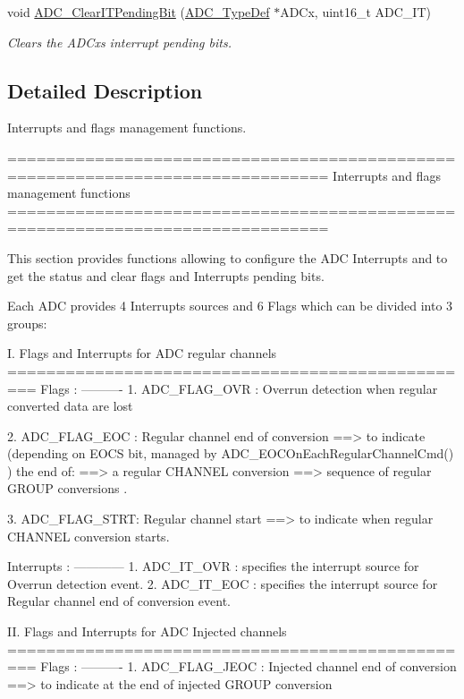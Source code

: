 \begin{DoxyCompactItemize}
void \hyperlink{group___a_d_c___group7_ga601c6a67bd883eb631ecc7aa5e999b9c}{A\+D\+C\+\_\+\+Clear\+I\+T\+Pending\+Bit} (\hyperlink{struct_a_d_c___type_def}{A\+D\+C\+\_\+\+Type\+Def} $\ast$A\+D\+Cx, uint16\+\_\+t A\+D\+C\+\_\+\+IT)
\begin{DoxyCompactList}\small\item\em Clears the A\+D\+Cx\textquotesingle{}s interrupt pending bits. \end{DoxyCompactList}\end{DoxyCompactItemize}


\subsection{Detailed Description}
Interrupts and flags management functions. 

\begin{DoxyVerb} ===============================================================================
                   Interrupts and flags management functions
 ===============================================================================  

  This section provides functions allowing to configure the ADC Interrupts and 
  to get the status and clear flags and Interrupts pending bits.
  
  Each ADC provides 4 Interrupts sources and 6 Flags which can be divided into 
  3 groups:
  
  I. Flags and Interrupts for ADC regular channels
  =================================================
  Flags :
  ---------- 
     1. ADC_FLAG_OVR : Overrun detection when regular converted data are lost

     2. ADC_FLAG_EOC : Regular channel end of conversion ==> to indicate (depending 
              on EOCS bit, managed by ADC_EOCOnEachRegularChannelCmd() ) the end of:
               ==> a regular CHANNEL conversion 
               ==> sequence of regular GROUP conversions .

     3. ADC_FLAG_STRT: Regular channel start ==> to indicate when regular CHANNEL 
              conversion starts.

  Interrupts :
  ------------
     1. ADC_IT_OVR : specifies the interrupt source for Overrun detection event.  
     2. ADC_IT_EOC : specifies the interrupt source for Regular channel end of 
                     conversion event.
  
  
  II. Flags and Interrupts for ADC Injected channels
  =================================================
  Flags :
  ---------- 
     1. ADC_FLAG_JEOC : Injected channel end of conversion ==> to indicate at 
               the end of injected GROUP conversion  
              

\end{DoxyVerb}
